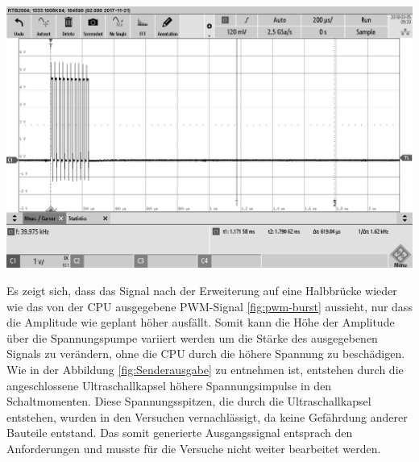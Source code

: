 \begin{minipage}{0.5\textwidth}
\includegraphics[width=1\textwidth%
]{Abbildungen/MessungenP1/PWM-Nach-der-Halbbrucke-mit-LS.png}
\label{fig:Senderausgabe}
\end{minipage}
Es zeigt sich, dass das Signal nach der Erweiterung auf eine Halbbrücke wieder wie das von der CPU ausgegebene PWM-Signal \ref{fig:pwm-burst} aussieht, nur dass die Amplitude wie geplant höher ausfällt. Somit kann die Höhe der Amplitude über die Spannungspumpe variiert werden um die Stärke des ausgegebenen Signals zu verändern, ohne die CPU durch die höhere Spannung zu beschädigen. Wie in der Abbildung \ref{fig:Senderausgabe} zu entnehmen ist, entstehen durch die angeschlossene Ultraschallkapsel höhere Spannungsimpulse in den Schaltmomenten. Diese Spannungsspitzen, die durch die Ultraschallkapsel entstehen, wurden in den Versuchen vernachlässigt, da keine Gefährdung anderer Bauteile entstand. Das somit generierte Ausgangssignal entsprach den Anforderungen und musste für die Versuche nicht weiter bearbeitet werden.
